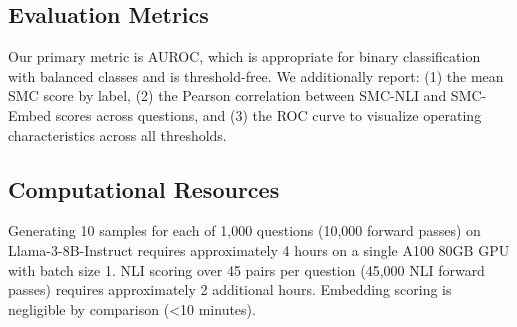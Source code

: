 \subsection{Evaluation Metrics}

Our primary metric is AUROC, which is appropriate for binary classification with balanced classes and is threshold-free. We additionally report: (1) the mean SMC score by label, (2) the Pearson correlation between SMC-NLI and SMC-Embed scores across questions, and (3) the ROC curve to visualize operating characteristics across all thresholds.

\subsection{Computational Resources}

Generating 10 samples for each of 1,000 questions (10,000 forward passes) on Llama-3-8B-Instruct requires approximately 4 hours on a single A100 80GB GPU with batch size 1. NLI scoring over 45 pairs per question (45,000 NLI forward passes) requires approximately 2 additional hours. Embedding scoring is negligible by comparison (\textless 10 minutes).
